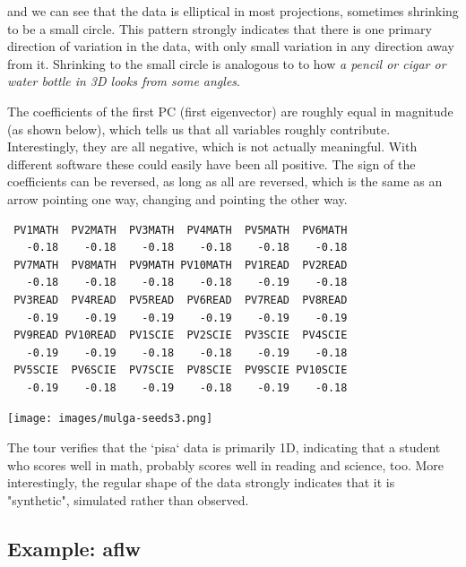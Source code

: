 \documentclass[
  letterpaper,
]{krantz}
\newenvironment{Shaded}{\begin{snugshade}}{\end{snugshade}}
\newcommand{\DecValTok}[1]{\textcolor[rgb]{0.68,0.00,0.00}{#1}}
\newcommand{\FunctionTok}[1]{\textcolor[rgb]{0.28,0.35,0.67}{#1}}
\newcommand{\NormalTok}[1]{\textcolor[rgb]{0.00,0.23,0.31}{#1}}
\newcommand{\SpecialCharTok}[1]{\textcolor[rgb]{0.37,0.37,0.37}{#1}}
\newcommand{\insightbox}[1]{%
\noindent\colorbox{insight!30}{%
\begin{minipage}{0.98\textwidth}%
    \centering%
    \begin{minipage}[c]{0.15\textwidth} %
      \texttt{[image: images/mulga-seeds3.png]} %
    \end{minipage}%
    \hfill %
    \begin{minipage}[c]{0.8\textwidth} %
      \bigskip%
      \textsf{#1}%
      \bigskip%
    \end{minipage}%
    \hspace*{3mm}%
  \end{minipage}%
}%
}
\begin{document}
and we can see that the data is elliptical in most projections,
sometimes shrinking to be a small circle. This pattern strongly
indicates that there is one primary direction of variation in the data,
with only small variation in any direction away from it. Shrinking to
the small circle is analogous to to how \emph{a pencil or cigar or water
bottle in 3D looks from some angles}.

The coefficients of the first PC (first eigenvector) are roughly equal
in magnitude (as shown below), which tells us that all variables roughly
contribute. Interestingly, they are all negative, which is not actually
meaningful. With different software these could easily have been all
positive. The sign of the coefficients can be reversed, as long as all
are reversed, which is the same as an arrow pointing one way, changing
and pointing the other way.

\begin{Shaded}
\end{Shaded}

\begin{verbatim}
 PV1MATH  PV2MATH  PV3MATH  PV4MATH  PV5MATH  PV6MATH 
   -0.18    -0.18    -0.18    -0.18    -0.18    -0.18 
 PV7MATH  PV8MATH  PV9MATH PV10MATH  PV1READ  PV2READ 
   -0.18    -0.18    -0.18    -0.18    -0.19    -0.18 
 PV3READ  PV4READ  PV5READ  PV6READ  PV7READ  PV8READ 
   -0.19    -0.19    -0.19    -0.19    -0.19    -0.19 
 PV9READ PV10READ  PV1SCIE  PV2SCIE  PV3SCIE  PV4SCIE 
   -0.19    -0.19    -0.18    -0.18    -0.19    -0.18 
 PV5SCIE  PV6SCIE  PV7SCIE  PV8SCIE  PV9SCIE PV10SCIE 
   -0.19    -0.18    -0.19    -0.18    -0.19    -0.18 
\end{verbatim}

\insightbox{The tour verifies that the `pisa` data is primarily 1D, indicating that a student who scores well in math, probably scores well in reading and science, too. More interestingly, the regular shape of the data strongly indicates that it is "synthetic", simulated rather than observed.}

\hypertarget{example-aflw}{%
\subsection{Example: aflw}\label{example-aflw}}
\end{document}
